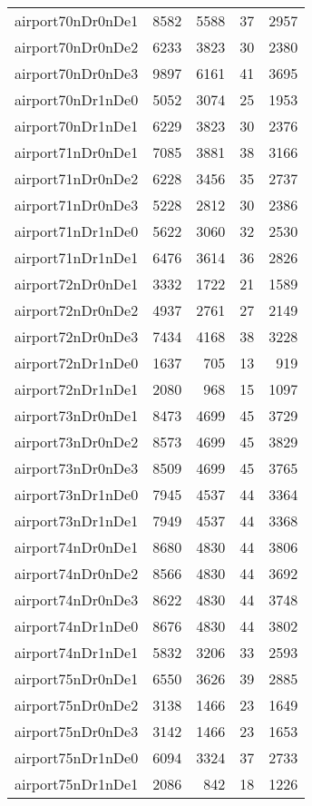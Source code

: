 \begin{longtable}{lrrrr}
airport70nDr0nDe1 & 8582 & 5588 & 37 & 2957 \\
airport70nDr0nDe2 & 6233 & 3823 & 30 & 2380 \\
airport70nDr0nDe3 & 9897 & 6161 & 41 & 3695 \\
airport70nDr1nDe0 & 5052 & 3074 & 25 & 1953 \\
airport70nDr1nDe1 & 6229 & 3823 & 30 & 2376 \\
airport71nDr0nDe1 & 7085 & 3881 & 38 & 3166 \\
airport71nDr0nDe2 & 6228 & 3456 & 35 & 2737 \\
airport71nDr0nDe3 & 5228 & 2812 & 30 & 2386 \\
airport71nDr1nDe0 & 5622 & 3060 & 32 & 2530 \\
airport71nDr1nDe1 & 6476 & 3614 & 36 & 2826 \\
airport72nDr0nDe1 & 3332 & 1722 & 21 & 1589 \\
airport72nDr0nDe2 & 4937 & 2761 & 27 & 2149 \\
airport72nDr0nDe3 & 7434 & 4168 & 38 & 3228 \\
airport72nDr1nDe0 & 1637 & 705 & 13 & 919 \\
airport72nDr1nDe1 & 2080 & 968 & 15 & 1097 \\
airport73nDr0nDe1 & 8473 & 4699 & 45 & 3729 \\
airport73nDr0nDe2 & 8573 & 4699 & 45 & 3829 \\
airport73nDr0nDe3 & 8509 & 4699 & 45 & 3765 \\
airport73nDr1nDe0 & 7945 & 4537 & 44 & 3364 \\
airport73nDr1nDe1 & 7949 & 4537 & 44 & 3368 \\
airport74nDr0nDe1 & 8680 & 4830 & 44 & 3806 \\
airport74nDr0nDe2 & 8566 & 4830 & 44 & 3692 \\
airport74nDr0nDe3 & 8622 & 4830 & 44 & 3748 \\
airport74nDr1nDe0 & 8676 & 4830 & 44 & 3802 \\
airport74nDr1nDe1 & 5832 & 3206 & 33 & 2593 \\
airport75nDr0nDe1 & 6550 & 3626 & 39 & 2885 \\
airport75nDr0nDe2 & 3138 & 1466 & 23 & 1649 \\
airport75nDr0nDe3 & 3142 & 1466 & 23 & 1653 \\
airport75nDr1nDe0 & 6094 & 3324 & 37 & 2733 \\
airport75nDr1nDe1 & 2086 & 842 & 18 & 1226 \\

\end{longtable}
